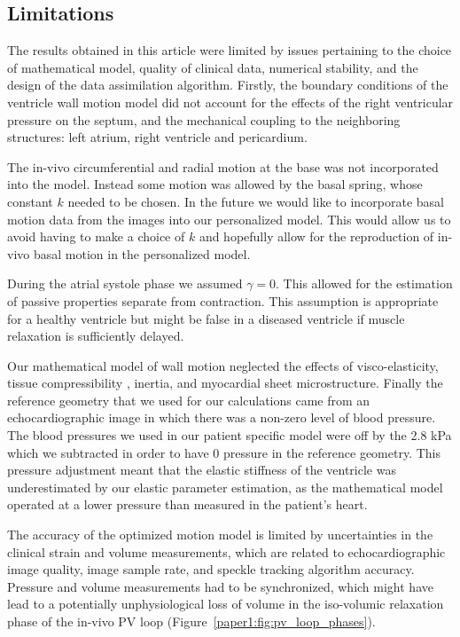 \subsection{Limitations}
\label{paper1:sec:limitations}
The results obtained in this article were limited by issues pertaining
to the choice of mathematical model, quality of clinical data,
numerical stability, and the design of the data assimilation
algorithm.  Firstly, the boundary conditions of the ventricle wall
motion model did not account for the effects of the right ventricular
pressure on the septum, and the mechanical coupling to the
neighboring structures: left atrium, right ventricle and pericardium.

The in-vivo circumferential and radial motion at the base was not incorporated into the model.
Instead some motion was allowed by the basal spring, whose constant $k$ needed to be chosen.
In the future we would like to
incorporate basal motion data from the images into our personalized model. This would
allow us to avoid having to make a choice of $k$ and hopefully allow for the
reproduction of in-vivo basal motion in the personalized model.

During the atrial systole phase we assumed $\gamma = 0$. This allowed for 
the estimation of passive properties separate from contraction. This assumption 
is appropriate for a healthy ventricle but
might be false in a diseased ventricle if muscle relaxation is sufficiently delayed.

Our mathematical model of wall motion neglected the effects of
visco-elasticity, tissue compressibility \cite{yin1996compressibility},
inertia, and myocardial sheet
microstructure. Finally the reference geometry that we used for our
calculations came from an echocardiographic image in which there was a
non-zero level of blood pressure.  The blood pressures we used in our
patient specific model were off by the 2.8 kPa which we subtracted in
order to have 0 pressure in the reference geometry.  This pressure
adjustment meant that the elastic stiffness of the ventricle was
underestimated by our elastic parameter estimation, as the
mathematical model operated at a lower pressure than measured in the
patient's heart.

The accuracy of the optimized motion model is limited by uncertainties
in the clinical strain and volume measurements,
which are related to echocardiographic image quality,
image sample rate, and speckle tracking algorithm accuracy. 
Pressure and volume measurements had to be synchronized, which might
have lead to a potentially unphysiological loss of volume in the iso-volumic relaxation phase of
the in-vivo PV loop (Figure~\ref{paper1:fig:pv_loop_phases}).

